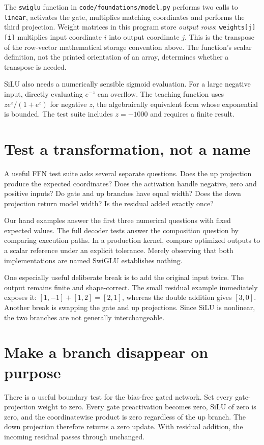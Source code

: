 The \texttt{swiglu} function in \texttt{code/foundations/model.py}
performs two calls to \texttt{linear}, activates the gate, multiplies
matching coordinates and performs the third projection. Weight matrices
in this program store \emph{output rows}: \texttt{weights[j][i]}
multiplies input coordinate $i$ into output coordinate $j$. This is the
transpose of the row-vector mathematical storage convention above.
The function's scalar definition, not the printed orientation of an
array, determines whether a transpose is needed.

SiLU also needs a numerically sensible sigmoid evaluation. For a large
negative input, directly evaluating $e^{-z}$ can overflow. The teaching
function uses $z e^z/(1+e^z)$ for negative $z$, the algebraically
equivalent form whose exponential is bounded. The test suite includes
$z=-1000$ and requires a finite result.

\section{Test a transformation, not a name}
A useful FFN test suite asks several separate questions. Does the up
projection produce the expected coordinates? Does the activation handle
negative, zero and positive inputs? Do gate and up branches have equal
width? Does the down projection return model width? Is the residual
added exactly once?

Our hand examples answer the first three numerical questions with fixed
expected values. The full decoder tests answer the composition question
by comparing execution paths. In a production kernel, compare optimized
outputs to a scalar reference under an explicit tolerance. Merely
observing that both implementations are named SwiGLU establishes nothing.

One especially useful deliberate break is to add the original input
twice. The output remains finite and shape-correct. The small residual
example immediately exposes it: $[1,-1]+[1,2]=[2,1]$, whereas the double
addition gives $[3,0]$. Another break is swapping the gate and up
projections. Since SiLU is nonlinear, the two branches are not generally
interchangeable.

\section{Make a branch disappear on purpose}
There is a useful boundary test for the bias-free gated network.
Set every gate-projection weight to zero. Every gate preactivation
becomes zero, SiLU of zero is zero, and the coordinatewise product
is zero regardless of the up branch. The down projection therefore
returns a zero update. With residual addition, the incoming residual
passes through unchanged.

